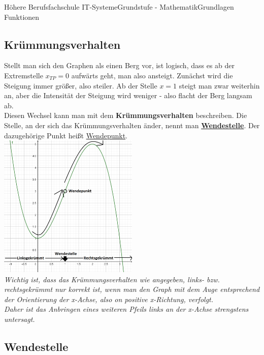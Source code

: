 \documentclass[11pt,twocolumn,oneside,openany,headings=optiontotoc,11pt,numbers=noenddot]{article}
\begin{document}
\begin{worksheet}{Höhere Berufsfachschule IT-Systeme}{Grundstufe - Mathematik}{Grundlagen Funktionen}
		\subsection*{Krümmungsverhalten}
		Stellt man sich den Graphen als einen Berg vor, ist logisch, dass es ab der Extremstelle \(x_{TP} = 0\) aufwärts geht, man also ansteigt. Zunächst wird die Steigung immer größer, also steiler. Ab der Stelle \(x = 1\) steigt man zwar weiterhin an, aber die Intensität der Steigung wird weniger - also flacht der Berg langsam ab.\\
		Diesen Wechsel kann man mit dem \textbf{Krümmungsverhalten} beschreiben. Die Stelle, an der sich das Krümmungsverhalten änder, nennt man \textbf{\underline{Wendestelle}}. Der dazugehörige Punkt heißt \underline{Wendepunkt}.\\
		\includegraphics[width=0.5\textwidth]{../99_Bilder/WP.png}\\
		\textit{Wichtig ist, dass das Krümmungsverhalten wie angegeben, \glqq{}links-\grqq{} bzw. \glqq{}rechtsgekrümmt\grqq{} nur korrekt ist, wenn man den Graph mit dem Auge entsprechend der Orientierung der x-Achse, also on positive x-Richtung, verfolgt.\\ Daher ist das Anbringen eines weiteren Pfeils links an der x-Achse strengstens untersagt.}
		\subsection*{Wendestelle}
	\end{worksheet}
\end{document}
